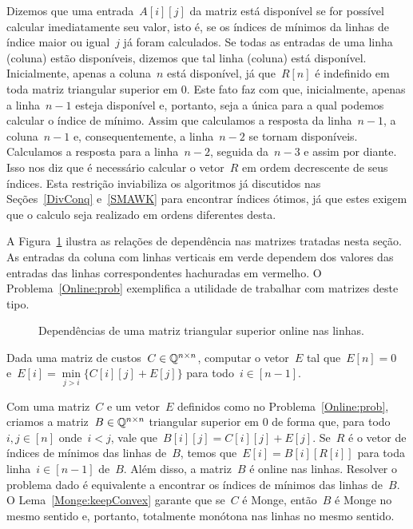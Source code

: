 Dizemos que uma entrada~$A[i][j]$ da matriz está disponível se for possível calcular imediatamente seu valor, isto é, se os índices de mínimos da linhas de índice maior ou igual~$j$ já foram calculados. Se todas as entradas de uma linha (coluna) estão disponíveis, dizemos que tal linha (coluna) está disponível. Inicialmente, apenas a coluna~$n$ está disponível, já que~$R[n]$ é indefinido em toda matriz triangular superior em 0. Este fato faz com que, inicialmente, apenas a linha~$n-1$ esteja disponível e, portanto, seja a única para a qual podemos calcular o índice de mínimo. Assim que calculamos a resposta da linha~$n-1$, a coluna~$n-1$ e, consequentemente, a linha~$n-2$ se tornam disponíveis. Calculamos a resposta para a linha~$n-2$, seguida da~$n-3$ e assim por diante. Isso nos diz que é necessário calcular o vetor~$R$ em ordem decrescente de seus índices. Esta restrição inviabiliza os algoritmos já discutidos nas Seções~\ref{DivConq} e~\ref{SMAWK} para encontrar índices ótimos, já que estes exigem que o calculo seja realizado em ordens diferentes desta.

A Figura~\ref{Online:matrix:fig} ilustra as relações de dependência nas matrizes tratadas nesta seção. As entradas da coluna com linhas verticais em verde dependem dos valores das entradas das linhas correspondentes hachuradas em vermelho. O Problema~\ref{Online:prob} exemplifica a utilidade de trabalhar com matrizes deste tipo.

\begin{figure}[h]
    \centering
    
    \caption{Dependências de uma matriz triangular superior online nas linhas.} \label{Online:matrix:fig}
\end{figure}

\begin{prob} \label{Online:prob}
Dada uma matriz de custos~$C \in \mathbb{Q}^{n \times n}$, computar o vetor~$E$ tal que~$E[n] = 0$ e~${ E[i] = \min\limits_{j>i} \{ C[i][j] + E[j] \} }$ para todo~$i \in [n-1]$.
\end{prob}

Com uma matriz~$C$ e um vetor~$E$ definidos como no Problema~\ref{Online:prob}, criamos a matriz~$B \in \mathbb{Q}^{n \times n}$ triangular superior em 0 de forma que, para todo~$i,j \in [n]$ onde~$i < j$, vale que~$B[i][j] = C[i][j] + E[j]$. Se~$R$ é o vetor de índices de mínimos das linhas de~$B$, temos que~$E[i] = B[i][R[i]]$ para toda linha~$i \in [n-1]$ de~$B$. Além disso, a matriz~$B$ é online nas linhas. Resolver o problema dado é equivalente a encontrar os índices de mínimos das linhas de~$B$. O Lema~\ref{Monge:keepConvex} garante que se~$C$ é Monge, então~$B$ é Monge no mesmo sentido e, portanto, totalmente monótona nas linhas no mesmo sentido.

